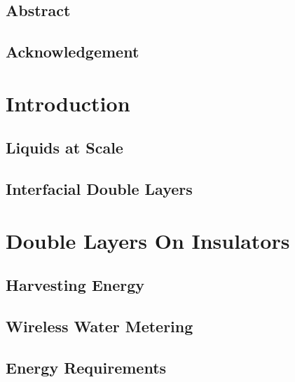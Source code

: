 




\rmfamily
\tableofcontents{}
\listoffigures
\listoftables
\printnomenclature{}
\onehalfspacing

\chapter*{Abstract}


\chapter*{Acknowledgement}


\part{Introduction}
    \chapter{Liquids at Scale}
        
    \chapter{Interfacial Double Layers}
        

\part{\label{part:doubleLayersOnInsulators}Double Layers On Insulators}
    \chapter{Harvesting Energy}
        
    \chapter{Wireless Water Metering}
        
    \chapter{Energy Requirements}

